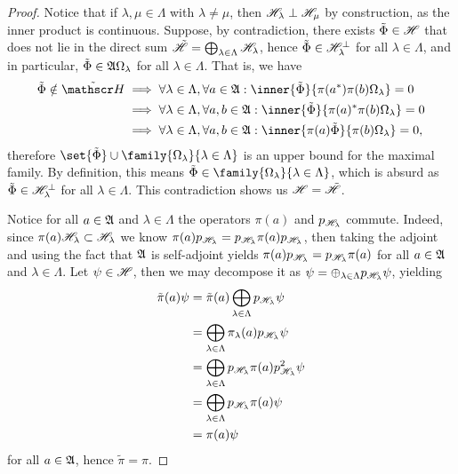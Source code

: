 \begin{proof}
    Notice that if \(\lambda, \mu \in \Lambda\) with \(\lambda \neq \mu\), then \(\mathscr{H}_{\lambda} \perp \mathscr{H}_{\mu}\) by construction, as the inner product is continuous. Suppose, by contradiction, there exists \(\tilde{\Phi} \in \mathscr{H}\) that does not lie in the direct sum \(\tilde{\mathscr{H}} = \bigoplus_{\lambda \in \Lambda} \mathscr{H}_\lambda\), hence \(\tilde{\Phi} \in \mathscr{H}_\lambda^\perp\) for all \(\lambda \in \Lambda\), and in particular, \(\tilde{\Phi} \in \mathfrak{A}\Omega_{\lambda}\) for all \(\lambda \in \Lambda\). That is, we have
    \begin{align*}
        \tilde{\Phi} \notin \tilde{\hilbert} &\implies \forall \lambda \in \Lambda, \forall a \in \algebra{A} : \inner{\tilde{\Phi}}{\pi(a^{\ast})\pi(b)\Omega_\lambda} = 0\\
                                             &\implies \forall \lambda \in \Lambda, \forall a,b\in \algebra{A} : \inner{\tilde{\Phi}}{\pi(a)^{\ast}\pi(b)\Omega_{\lambda}} = 0\\
                                             &\implies \forall \lambda \in \Lambda, \forall a,b \in \algebra{A}: \inner{\pi(a)\tilde{\Phi}}{\pi(b)\Omega_\lambda} = 0,
    \end{align*}
    therefore \(\set{\tilde{\Phi}}\cup \family{\Omega_\lambda}{\lambda \in \Lambda}\) is an upper bound for the maximal family. By definition, this means \(\tilde{\Phi} \in \family{\Omega_\lambda}{\lambda \in \Lambda}\), which is absurd as \(\tilde{\Phi} \in \mathscr{H}_{\lambda}^\perp\) for all \(\lambda \in \Lambda\). This contradiction shows us \(\mathscr{H} = \tilde{\mathscr{H}}\).

    Notice for all \(a \in \mathfrak{A}\) and \(\lambda \in \Lambda\) the operators \(\pi(a)\) and \(p_{\mathscr{H}_\lambda}\) commute. Indeed, since \(\pi(a) \mathscr{H}_\lambda \subset \mathscr{H}_\lambda\) we know \(\pi(a)p_{\mathscr{H}_\lambda} = p_{\mathscr{H}_\lambda}\pi(a)p_{\mathscr{H}_\lambda}\), then taking the adjoint and using the fact that \(\mathfrak{A}\) is self-adjoint yields \(\pi(a)p_{\mathscr{H}_\lambda} = p_{\mathscr{H}_\lambda}\pi(a)\) for all \(a \in \mathfrak{A}\) and \(\lambda \in \Lambda\). Let \(\psi \in \mathscr{H}\), then we may decompose it as \(\psi = \oplus_{\lambda \in \Lambda}p_{\mathscr{H}_\lambda}\psi\), yielding
    \begin{align*}
        \tilde{\pi}(a)\psi &= \tilde{\pi}(a)\bigoplus_{\lambda \in \Lambda} p_{\mathscr{H}_\lambda}\psi\\
                           &= \bigoplus_{\lambda \in \Lambda} \pi_{\lambda}(a) p_{\mathscr{H}_\lambda}\psi\\
                           &= \bigoplus_{\lambda \in \Lambda} p_{\mathscr{H}_\lambda} \pi(a) p_{\mathscr{H}_\lambda}^2 \psi\\
                           &= \bigoplus_{\lambda \in \Lambda} p_{\mathscr{H}_\lambda} \pi(a) \psi\\
                           &= \pi(a) \psi
    \end{align*}
    for all \(a \in \mathfrak{A}\), hence \(\tilde{\pi} = \pi\).
\end{proof}
